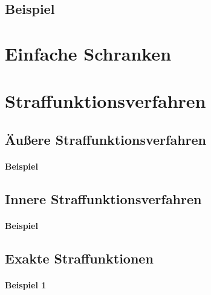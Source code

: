         \subsection{Beispiel} %

    \section{Einfache Schranken} %

    \section{Straffunktionsverfahren} %

        \subsection{Äußere Straffunktionsverfahren} %

            \paragraph{Beispiel} %

        \subsection{Innere Straffunktionsverfahren} %

            \paragraph{Beispiel} %

        \subsection{Exakte Straffunktionen} %

            \paragraph{Beispiel 1} %

